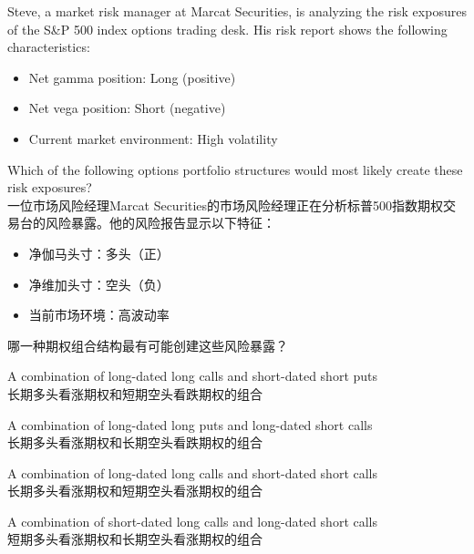 \documentclass{article}
\newcounter{question} %
\begin{document}
            \begin{question}
                Steve, a market risk manager at Marcat Securities, is analyzing the risk exposures of the S\&P 500 index options trading desk. His risk report shows the following characteristics:
                \begin{itemize}
                    \item Net gamma position: Long (positive)
                    \item Net vega position: Short (negative)
                    \item Current market environment: High volatility
                \end{itemize}
                Which of the following options portfolio structures would most likely create these risk exposures?
                \\一位市场风险经理Marcat Securities的市场风险经理正在分析标普500指数期权交易台的风险暴露。他的风险报告显示以下特征：
                \begin{itemize}
                    \item 净伽马头寸：多头（正）
                    \item 净维加头寸：空头（负）
                    \item 当前市场环境：高波动率
                \end{itemize}
                哪一种期权组合结构最有可能创建这些风险暴露？
                \end{question}
                
                \begin{choices}
                \item A combination of long-dated long calls and short-dated short puts\\
                长期多头看涨期权和短期空头看跌期权的组合
                \item A combination of long-dated long puts and long-dated short calls\\
                长期多头看涨期权和长期空头看跌期权的组合
                \item A combination of long-dated long calls and short-dated short calls\\
                长期多头看涨期权和短期空头看涨期权的组合
                \item A combination of short-dated long calls and long-dated short calls\\
                短期多头看涨期权和长期空头看涨期权的组合
                \end{choices}
                
\end{document}
